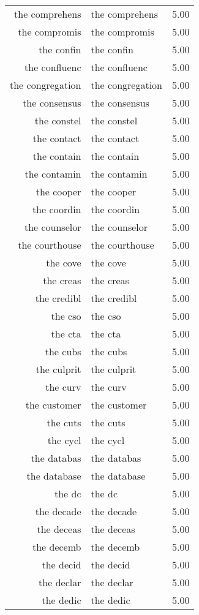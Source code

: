 \begin{table}[ht]
\begin{tabular}{rlr}
  the comprehens & the comprehens & 5.00 \\ 
  the compromis & the compromis & 5.00 \\ 
  the confin & the confin & 5.00 \\ 
  the confluenc & the confluenc & 5.00 \\ 
  the congregation & the congregation & 5.00 \\ 
  the consensus & the consensus & 5.00 \\ 
  the constel & the constel & 5.00 \\ 
  the contact & the contact & 5.00 \\ 
  the contain & the contain & 5.00 \\ 
  the contamin & the contamin & 5.00 \\ 
  the cooper & the cooper & 5.00 \\ 
  the coordin & the coordin & 5.00 \\ 
  the counselor & the counselor & 5.00 \\ 
  the courthouse & the courthouse & 5.00 \\ 
  the cove & the cove & 5.00 \\ 
  the creas & the creas & 5.00 \\ 
  the credibl & the credibl & 5.00 \\ 
  the cso & the cso & 5.00 \\ 
  the cta & the cta & 5.00 \\ 
  the cubs & the cubs & 5.00 \\ 
  the culprit & the culprit & 5.00 \\ 
  the curv & the curv & 5.00 \\ 
  the customer & the customer & 5.00 \\ 
  the cuts & the cuts & 5.00 \\ 
  the cycl & the cycl & 5.00 \\ 
  the databas & the databas & 5.00 \\ 
  the database & the database & 5.00 \\ 
  the dc & the dc & 5.00 \\ 
  the decade & the decade & 5.00 \\ 
  the deceas & the deceas & 5.00 \\ 
  the decemb & the decemb & 5.00 \\ 
  the decid & the decid & 5.00 \\ 
  the declar & the declar & 5.00 \\ 
  the dedic & the dedic & 5.00 \\ 

\end{tabular}
\end{table}
